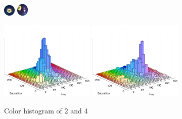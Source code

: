 \begin{figure}[H]
\centering
\subfloat
{
	\includegraphics[width=0.05\textwidth]{images/balls/2.png}
}
\hspace{0.4\textwidth}
\subfloat
{
	\includegraphics[width=0.05\textwidth]{images/balls/4.png}
}

\subfloat
{
	\includegraphics[width=0.4\textwidth]{images/ballhist/2}
}
\subfloat
{
	\includegraphics[width=0.4\textwidth]{images/ballhist/4}
}
\caption{Color histogram of 2 and 4}
\label{fig:}
\end{figure}